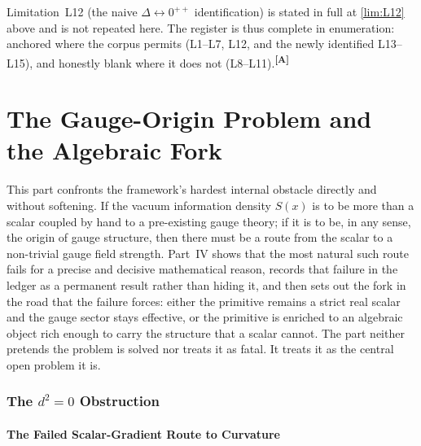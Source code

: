 \documentclass[12pt,a4paper,twoside]{article}
\theoremstyle{plain}
\theoremstyle{definition}
\theoremstyle{remark}
\newcommand{\catmark}[1]{\textsuperscript{\textsf{\textbf{[#1]}}}}
\begin{document}
\noindent Limitation~L12 (the naive $\Delta\!\leftrightarrow\!0^{++}$ identification) is stated in full at \cref{lim:L12} above and is not repeated here. The register is thus complete in enumeration: anchored where the corpus permits (L1--L7, L12, and the newly identified L13--L15), and honestly blank where it does not (L8--L11).\catmark{A}



\newpage
\part{The Gauge-Origin Problem and the Algebraic Fork}
\label{part:gauge-origin}

\noindent This part confronts the framework's hardest internal obstacle directly and without softening. If the vacuum information density $S(x)$ is to be more than a scalar coupled by hand to a pre-existing gauge theory; if it is to be, in any sense, the origin of gauge structure, then there must be a route from the scalar to a non-trivial gauge field strength. Part~IV shows that the most natural such route fails for a precise and decisive mathematical reason, records that failure in the ledger as a permanent result rather than hiding it, and then sets out the fork in the road that the failure forces: either the primitive remains a strict real scalar and the gauge sector stays effective, or the primitive is enriched to an algebraic object rich enough to carry the structure that a scalar cannot. The part neither pretends the problem is solved nor treats it as fatal. It treats it as the central open problem it is.
\newpage
\section{The \texorpdfstring{$d^2 = 0$}{d2=0} Obstruction}
\label{sec:d2-obstruction}

\subsection{The Failed Scalar-Gradient Route to Curvature}
\label{subsec:failed-scalar-gradient}
\end{document}
